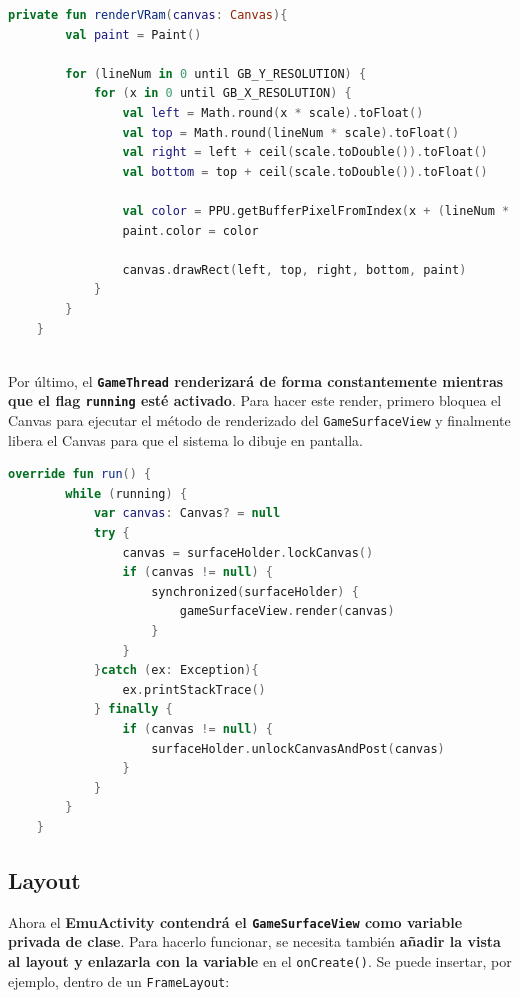 \begin{lstlisting}[language=Kotlin, caption={Medición y Escalado del Canvas.}, label={code:surfaceonmeasure}]
    private fun renderVRam(canvas: Canvas){
        val paint = Paint()

        for (lineNum in 0 until GB_Y_RESOLUTION) {
            for (x in 0 until GB_X_RESOLUTION) {
                val left = Math.round(x * scale).toFloat()
                val top = Math.round(lineNum * scale).toFloat()
                val right = left + ceil(scale.toDouble()).toFloat()
                val bottom = top + ceil(scale.toDouble()).toFloat()

                val color = PPU.getBufferPixelFromIndex(x + (lineNum * GB_X_RESOLUTION))
                paint.color = color

                canvas.drawRect(left, top, right, bottom, paint)
            }
        }
    }
    
\end{lstlisting}

Por último, el \textbf{\texttt{GameThread} renderizará de forma constantemente mientras que el flag \texttt{running} esté activado}. Para hacer este render, primero bloquea el Canvas para ejecutar el método de renderizado del \texttt{GameSurfaceView} y finalmente libera el Canvas para que el sistema lo dibuje en pantalla.
\clearpage
\begin{lstlisting}[language=Kotlin, caption={Renderizado en el GameThread.}, label={code:surfacerenderthread}]
    override fun run() {
        while (running) {
            var canvas: Canvas? = null
            try {
                canvas = surfaceHolder.lockCanvas()
                if (canvas != null) {
                    synchronized(surfaceHolder) {
                        gameSurfaceView.render(canvas)
                    }
                }
            }catch (ex: Exception){
                ex.printStackTrace()
            } finally {
                if (canvas != null) {
                    surfaceHolder.unlockCanvasAndPost(canvas)
                }
            }
        }
    }
\end{lstlisting}

\subsection{Layout}

Ahora el \textbf{EmuActivity contendrá el \texttt{GameSurfaceView} como variable privada de clase}. Para hacerlo funcionar, se necesita también \textbf{añadir la vista al layout y enlazarla con la variable} en el \texttt{onCreate()}. Se puede insertar, por ejemplo, dentro de un \texttt{FrameLayout}:

